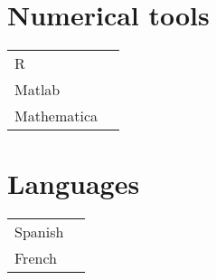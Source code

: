 \documentclass[a4paper,10pt]{article}
\begin{document}
\MySkip

\begin{multicols}{2}
\section*{Numerical tools}
\begin{tabular}{ll}
R              & \SkillBull{$\bullet\bullet\bullet\,\circ$} \\
Matlab         & \SkillBull{$\bullet\bullet\bullet\,\circ$} \\
Mathematica    & \SkillBull{$\bullet\,\circ\,\circ\,\circ$} \\
\end{tabular}

\vfill\null \columnbreak

\section*{Languages}
\begin{tabular}{ll}
  Spanish        & \SkillBull{$\bullet \bullet \bullet \, \circ$}\\
  French         & \SkillBull{$\bullet \, \circ \, \circ \, \circ$}\\
\end{tabular}

\end{multicols}

\LastUpdate
\end{document}
